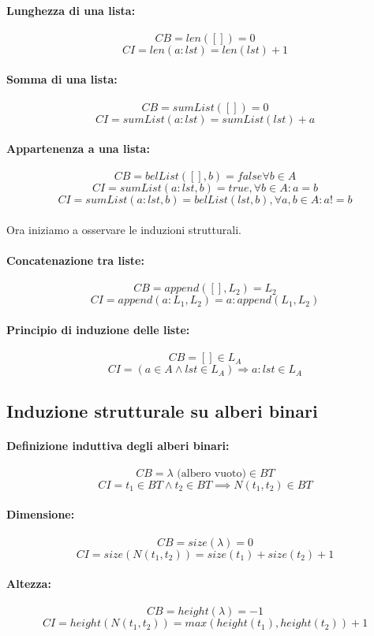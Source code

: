 \documentclass[a4paper,12pt]{article}
\begin{document}
\paragraph{Lunghezza di una lista: }
\[
CB = len([]) = 0
\]
\[
CI = len(a:lst) = len(lst) + 1
\]
\paragraph{Somma di una lista: }
\[
CB = sumList([]) = 0
\]
\[
CI = sumList(a:lst) = sumList(lst) + a
\]
\paragraph{Appartenenza a una lista: }
\[
CB = belList([],b) = false \forall b \in A
\]
\[
CI = sumList(a:lst, b) = true, \forall b \in A : a = b
\]
\[
CI = sumList(a:lst, b) = belList(lst,b), \forall a,b \in A : a != b
\]
\\Ora iniziamo a osservare le induzioni strutturali.
\paragraph{Concatenazione tra liste: }
\[
CB = append([], L_2) = L_2
\]
\[
CI = append(a : L_1, L_2) = a : append(L_1, L_2)
\]
\paragraph{Principio di induzione delle liste: }
\[
CB = [] \in L_A
\]
\[
CI = (a \in A \land lst \in L_A) \Longrightarrow a: lst \in L_A
\]

\subsection{Induzione strutturale su alberi binari}
\paragraph{Definizione induttiva degli alberi binari:}
\[
CB = \lambda \text{ (albero vuoto)} \in BT
\]
\[
CI = t_1 \in BT \land t_2 \in BT \implies N(t_1,t_2) \in BT
\]
\paragraph{Dimensione: }
\[
CB = size(\lambda) = 0
\]
\[
CI = size(N(t_1,t_2)) = size (t_1) + size(t_2) + 1
\]
\paragraph{Altezza: }
\[
CB = height(\lambda) = -1
\]
\[
CI = height(N(t_1,t_2)) = max(height(t_1),height(t_2)) + 1
\]
\end{document}
